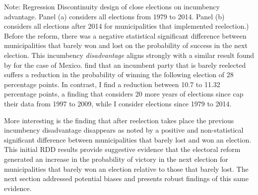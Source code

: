 \documentclass[12pt]{amsart}
\numberwithin{equation}{section}
\theoremstyle{definition}
\theoremstyle{definition}
\theoremstyle{definition}
\begin{document}
\begin{appendix}
\begin{figure}[H]
\end{figure} 
       Note: Regression Discontinuity design of close elections on incumbency advantage. Panel (a) considers all elections from 1979 to 2014. Panel (b) considers all elections after 2014 for municipalities that implemented reelection.) 
\\
       
Before the reform, there was a negative statistical significant difference between municipalities that barely won and lost on the probability of success in the next election. This incumbency \emph{disadvantage} aligns strongly with a similar result found by \citet{klasnja_titiunik_2017} for the case of Mexico. \citet{klasnja_titiunik_2017} find that an incumbent party that is barely reelected suffers a reduction in the probability of winning the following election of 28 percentage points. In contrast, I find a reduction between 10.7 to 11.32 percentage points, a finding that considers 20 more years of elections since \citet{klasnja_titiunik_2017} cap their data from 1997 to 2009, while I consider elections since 1979 to 2014. 

More interesting is the finding that after reelection takes place the previous incumbency disadvantage disappears as noted by a positive and non-statistical significant difference between municipalities that barely lost and won an election. This initial RDD results provide suggestive evidence that the electoral reform generated an increase in the probability of victory in the next election for municipalities that barely won an election relative to those that barely lost. The next section addressed potential biases and presents robust findings of this same evidence.  


 \\ 
  
\begin{table}[!htbp]\def\sym#1{\ifmmode^{#1}\else\(^{#1}\)\fi}
\caption{Regression Discontinuity Design of Close Elections on Incumbency Advantage, comparing pre and post-Term Limit Reform estimates}
\label{tab:rdd}
\begin{center} 
\end{center}
\end{table}
\end{appendix}
\end{document}
